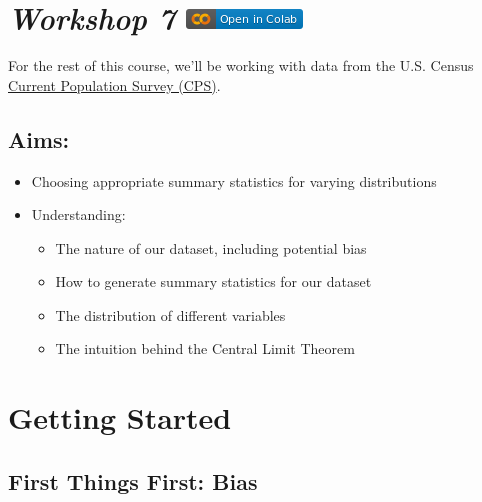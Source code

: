 \documentclass[
  letterpaper,
  DIV=11,
  numbers=noendperiod]{scrreprt}
\providecommand{\tightlist}{%
  \setlength{\itemsep}{0pt}\setlength{\parskip}{0pt}}\usepackage{longtable,booktabs,array}
\begin{document}
\hypertarget{workshop-7-open-in-colab}{%
\section[\emph{Workshop 7} ]{\texorpdfstring{\emph{Workshop 7}
\href{https://colab.research.google.com/github/oballinger/QM2/blob/main/notebooks/W07.\%20Distributions\%20and\%20Basic\%20Statistics.ipynb}{\protect\includegraphics{notebooks/../colab-badge.png}}}{Workshop 7 Open In Colab}}\label{workshop-7-open-in-colab}}

For the rest of this course, we'll be working with data from the U.S.
Census \href{https://www.census.gov/programs-surveys/cps.html}{Current
Population Survey (CPS)}.

\hypertarget{aims-3}{%
\subsection{Aims:}\label{aims-3}}

\begin{itemize}
\item
  Choosing appropriate summary statistics for varying distributions
\item
  Understanding:

  \begin{itemize}
  \tightlist
  \item
    The nature of our dataset, including potential bias
  \item
    How to generate summary statistics for our dataset
  \item
    The distribution of different variables
  \item
    The intuition behind the Central Limit Theorem
  \end{itemize}
\end{itemize}

\hypertarget{getting-started}{%
\section{Getting Started}\label{getting-started}}

\hypertarget{first-things-first-bias}{%
\subsection{First Things First: Bias}\label{first-things-first-bias}}
\end{document}
